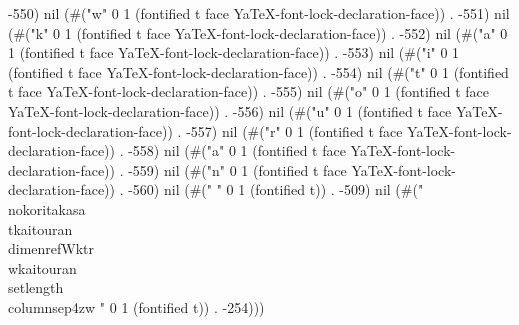 -550) nil (#("w" 0 1 (fontified t face YaTeX-font-lock-declaration-face)) . -551) nil (#("k" 0 1 (fontified t face YaTeX-font-lock-declaration-face)) . -552) nil (#("a" 0 1 (fontified t face YaTeX-font-lock-declaration-face)) . -553) nil (#("i" 0 1 (fontified t face YaTeX-font-lock-declaration-face)) . -554) nil (#("t" 0 1 (fontified t face YaTeX-font-lock-declaration-face)) . -555) nil (#("o" 0 1 (fontified t face YaTeX-font-lock-declaration-face)) . -556) nil (#("u" 0 1 (fontified t face YaTeX-font-lock-declaration-face)) . -557) nil (#("r" 0 1 (fontified t face YaTeX-font-lock-declaration-face)) . -558) nil (#("a" 0 1 (fontified t face YaTeX-font-lock-declaration-face)) . -559) nil (#("n" 0 1 (fontified t face YaTeX-font-lock-declaration-face)) . -560) nil (#("
" 0 1 (fontified t)) . -509) nil (#("\\nokoritakasa\\tkaitouran%
\\dimenref{Wktr}\\wkaitouran%
\\setlength{\\columnsep}{4zw}%
" 0 1 (fontified t)) . -254)))
